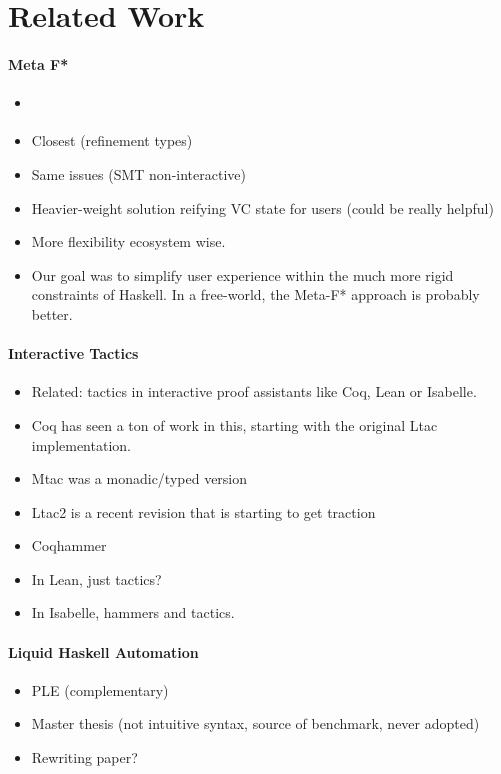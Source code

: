 \section{Related Work}
\label{sec:related}

\paragraph{Meta F*}
\begin{itemize}
\item \cite{MetaF}
\item Closest (refinement types)
\item Same issues (SMT non-interactive)
\item Heavier-weight solution reifying VC state for users (could be really helpful)
\item More flexibility ecosystem wise.
\item Our goal was to simplify user experience within the much more rigid constraints
  of Haskell. In a free-world, the Meta-F* approach is probably better.
\end{itemize}

\paragraph{Interactive Tactics}
\begin{itemize}
\item Related: tactics in interactive proof assistants like Coq, Lean or Isabelle.
\item Coq has seen a ton of work in this, starting with the original
  Ltac implementation.
\item Mtac was a monadic/typed version
\item Ltac2 is a recent revision that is starting to get traction~\cite{ComputingCorrectly}
\item Coqhammer~\cite{CoqHammer, Coqhammer-sauto}
\item In Lean, just tactics?
\item In Isabelle, hammers and tactics.
\end{itemize}

\paragraph{Liquid Haskell Automation}
\begin{itemize}
\item PLE (complementary) 
\item Master thesis (not intuitive syntax, source of benchmark, never adopted)
\item Rewriting paper? \cite{REST-rewriting}
\end{itemize}


